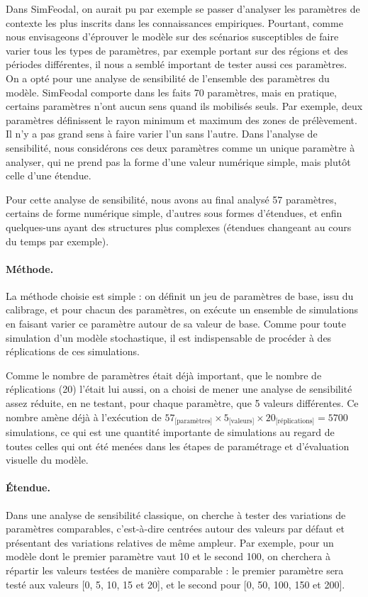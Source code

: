 Dans SimFeodal, on aurait pu par exemple se passer d'analyser les paramètres de contexte les plus inscrits dans les connaissances empiriques.
Pourtant, comme nous envisageons d'éprouver le modèle sur des scénarios susceptibles de faire varier tous les types de paramètres, par exemple portant sur des régions et des périodes différentes, il nous a semblé important de tester aussi ces paramètres.
On a opté pour une analyse de sensibilité de l'ensemble des paramètres du modèle.
SimFeodal comporte dans les faits 70 paramètres, mais en pratique, certains paramètres n'ont aucun sens quand ils mobilisés seuls.
Par exemple, deux paramètres définissent le rayon minimum et maximum des zones de prélèvement.
Il n'y a pas grand sens à faire varier l'un sans l'autre.
Dans l'analyse de sensibilité, nous considérons ces deux paramètres comme un unique paramètre à analyser, qui ne prend pas la forme d'une valeur numérique simple, mais plutôt celle d'une étendue.

Pour cette analyse de sensibilité, nous avons au final analysé 57 \og paramètres\fg{}, certains de forme numérique simple, d'autres sous formes d'étendues, et enfin quelques-uns ayant des structures plus complexes (étendues changeant au cours du temps par exemple).

\paragraph{Méthode.}
La méthode choisie est simple : on définit un jeu de paramètres de base, issu du calibrage, et pour chacun des paramètres, on exécute un ensemble de simulations en faisant varier ce paramètre autour de sa valeur de base.
Comme pour toute simulation d'un modèle stochastique, il est indispensable de procéder à des réplications de ces simulations.

Comme le nombre de paramètres était déjà important, que le nombre de réplications (20) l'était lui aussi, on a choisi de mener une analyse de sensibilité assez réduite, en ne testant, pour chaque paramètre, que 5 valeurs différentes.
Ce nombre amène déjà à l'exécution de $57_{\text{[paramètres]}} \times 5_{\text{[valeurs]}} \times 20_{\text{[réplications]}} = 5700$ simulations, ce qui est une quantité importante de simulations au regard de toutes celles qui ont été menées dans les étapes de paramétrage et d'évaluation visuelle du modèle.

\paragraph{Étendue.}\label{par:etendue-parametres}
Dans une analyse de sensibilité classique, on cherche à tester des variations de paramètres comparables, c'est-à-dire centrées autour des valeurs par défaut et présentant des variations relatives de même ampleur.
Par exemple, pour un modèle dont le premier paramètre vaut 10 et le second 100, on cherchera à répartir les valeurs testées de manière comparable : 
le premier paramètre sera testé aux valeurs [0, 5, 10, 15 et 20], et le second pour [0, 50, 100, 150 et 200].


